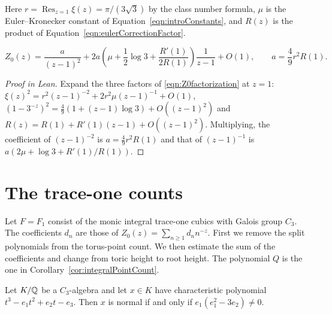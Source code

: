 \begin{equationnode}

\label{eqn:Z0LaurentR}


\leanok

Here $r=\operatorname{Res}_{z=1}\xi(z)=\pi/(3\sqrt3)$ by the class number formula, $\mu$ is the Euler--Kronecker constant of Equation~\ref{eqn:introConstants}, and $R(z)$ is the product of Equation~\ref{eqn:eulerCorrectionFactor}.

\begin{equation*} Z_0(z)=\frac{a}{(z-1)^2} +2a\left(\mu+\frac12\log3+\frac{R'(1)}{2R(1)}\right)\frac{1}{z-1} +O(1), \qquad a=\frac49r^2R(1). \end{equation*}

\end{equationnode}

\begin{proof}[Proof in Lean]

\leanok


Expand the three factors of \eqref{eqn:Z0factorization} at $z=1$: $\xi(z)^2=r^2(z-1)^{-2}+2r^2\mu(z-1)^{-1}+O(1)$, $(1-3^{-z})^2=\tfrac49(1+(z-1)\log3)+O((z-1)^2)$ and $R(z)=R(1)+R'(1)(z-1)+O((z-1)^2)$. Multiplying, the coefficient of $(z-1)^{-2}$ is $a=\tfrac49r^2R(1)$ and that of $(z-1)^{-1}$ is $a(2\mu+\log3+R'(1)/R(1))$.

\end{proof}

\chapter{The trace-one counts}

Let $F=F_1$ consist of the monic integral trace-one cubics with Galois group $C_3$. The coefficients $d_n$ are those of $Z_0(z)=\sum_{n\geq1}d_n n^{-z}$. First we remove the split polynomials from the torus-point count. We then estimate the sum of the coefficients and change from toric height to root height. The polynomial $Q$ is the one in Corollary~\ref{cor:integralPointCount}.

\begin{lemma}[Normality]

\label{lemma:normalityCriterion}


\leanok



 Let $K/\mathbb{Q}$ be a $C_3$-algebra and let $x\in K$ have characteristic polynomial $t^3-e_1t^2+e_2t-e_3$. Then $x$ is normal if and only if $e_1(e_1^2-3e_2)\neq0$. 

\end{lemma}

